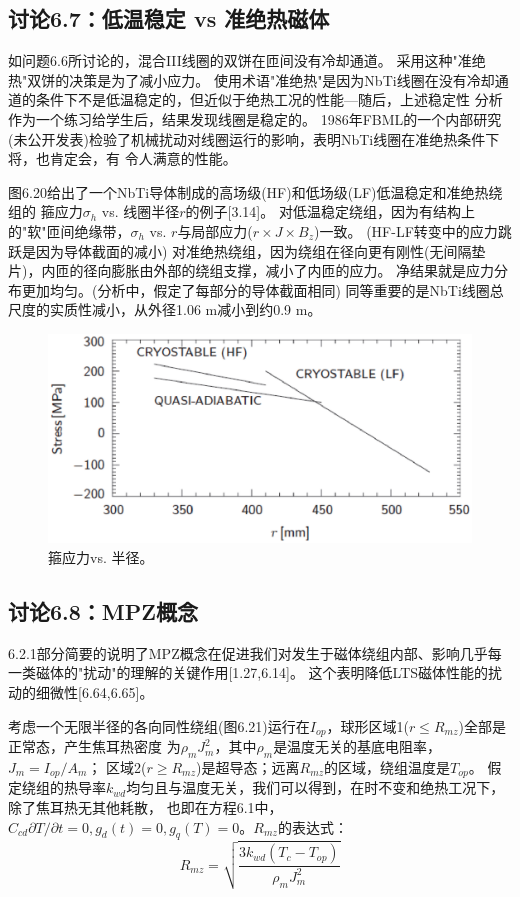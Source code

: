 \subsection{讨论6.7：低温稳定 vs 准绝热磁体}
如问题6.6所讨论的，混合III线圈的双饼在匝间没有冷却通道。
采用这种"准绝热"双饼的决策是为了减小应力。
使用术语"准绝热"是因为NbTi线圈在没有冷却通道的条件下不是低温稳定的，但近似于绝热工况的性能---随后，上述稳定性
分析作为一个练习给学生后，结果发现线圈是稳定的。
1986年FBML的一个内部研究(未公开发表)检验了机械扰动对线圈运行的影响，表明NbTi线圈在准绝热条件下将，也肯定会，有
令人满意的性能。

图6.20给出了一个NbTi导体制成的高场级(HF)和低场级(LF)低温稳定和准绝热绕组的
箍应力$\sigma_h$ vs. 线圈半径$r$的例子[3.14]。
对低温稳定绕组，因为有结构上的"软"匝间绝缘带，$\sigma_h$ vs. $r$与局部应力($r\times J\times B_z$)一致。
(HF-LF转变中的应力跳跃是因为导体截面的减小)
对准绝热绕组，因为绕组在径向更有刚性(无间隔垫片)，内匝的径向膨胀由外部的绕组支撑，减小了内匝的应力。
净结果就是应力分布更加均匀。(分析中，假定了每部分的导体截面相同)
同等重要的是NbTi线圈总尺度的实质性减小，从外径1.06 m减小到约0.9 m。

\begin{figure}[htbp]
	\centering
	\includegraphics[scale=0.7]{chpt6/figs/fig6.20.eps}
	\caption{箍应力vs. 半径。}
\end{figure}


\subsection{讨论6.8：MPZ概念}
6.2.1部分简要的说明了MPZ概念在促进我们对发生于磁体绕组内部、影响几乎每一类磁体的"扰动"的理解的关键作用[1.27,6.14]。
这个表明降低LTS磁体性能的扰动的细微性[6.64,6.65]。

考虑一个无限半径的各向同性绕组(图6.21)运行在$I_{op}$，球形区域1($r\le R_{mz}$)全部是正常态，产生焦耳热密度
为$\rho_m J_m^2$，其中$\rho_m$是温度无关的基底电阻率，$J_m=I_{op}/A_m$；
区域2($r\ge R_{mz}$)是超导态；远离$R_{mz}$的区域，绕组温度是$T_{op}$。
假定绕组的热导率$k_{wd}$均匀且与温度无关，我们可以得到，在时不变和绝热工况下，除了焦耳热无其他耗散，
也即在方程6.1中，$C_{cd}\partial T/\partial t=0,g_d(t)=0,g_q(T)=0$。$R_{mz}$的表达式：
\begin{equation}%
R_{mz}=\sqrt{\frac{3k_{wd}(T_c-T_{op})}{\rho_mJ_m^2}}
\end{equation}

